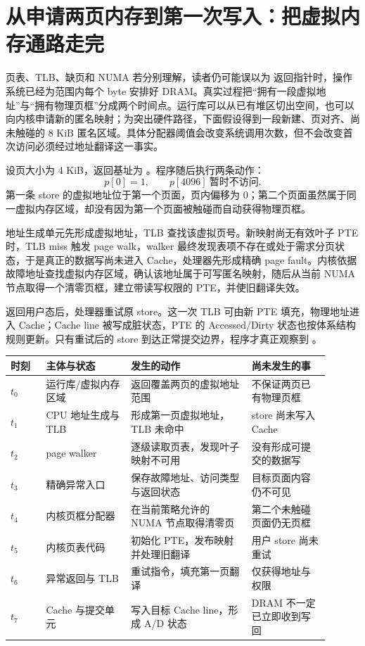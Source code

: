 \section{从申请两页内存到第一次写入：把虚拟内存通路走完}

页表、TLB、缺页和 NUMA 若分别理解，读者仍可能误以为  返回指针时，操作系统已经为范围内每个 byte 安排好 DRAM。真实过程把“拥有一段虚拟地址”与“拥有物理页框”分成两个时间点。运行库可以从已有堆区切出空间，也可以向内核申请新的匿名映射；为突出硬件路径，下面假设得到一段新建、页对齐、尚未触碰的 8 KiB 匿名区域。具体分配器阈值会改变系统调用次数，但不会改变首次访问必须经过地址翻译这一事实。

设页大小为 4 KiB，返回基址为 。程序随后执行两条动作：
\[
  p[0]=1,\qquad p[4096]\ \text{暂时不访问}.
\]
第一条 store 的虚拟地址位于第一个页面，页内偏移为 0；第二个页面虽然属于同一虚拟内存区域，却没有因为第一个页面被触碰而自动获得物理页框。


地址生成单元先形成虚拟地址，TLB 查找该虚拟页号。新映射尚无有效叶子 PTE 时，TLB miss 触发 page walk，walker 最终发现表项不存在或处于需求分页状态，于是真正的数据写尚未进入 Cache，处理器先形成精确 page fault。内核依据故障地址查找虚拟内存区域，确认该地址属于可写匿名映射，随后从当前 NUMA 节点取得一个清零页框，建立带读写权限的 PTE，并使旧翻译失效。

返回用户态后，处理器重试原 store。这一次 TLB 可由新 PTE 填充，物理地址进入 Cache；Cache line 被写成脏状态，PTE 的 Accessed/Dirty 状态也按体系结构规则更新。只有重试后的 store 到达正常提交边界，程序才真正观察到 。

\begin{longtable}{L{0.10\linewidth}L{0.24\linewidth}L{0.34\linewidth}L{0.22\linewidth}}
\toprule
时刻 & 主体与状态 & 发生的动作 & 尚未发生的事 \\
\midrule
$t_0$ & 运行库/虚拟内存区域 & 返回覆盖两页的虚拟地址范围 & 不保证两页已有物理页框 \\
$t_1$ & CPU 地址生成与 TLB & 形成第一页虚拟地址，TLB 未命中 & store 尚未写入 Cache \\
$t_2$ & page walker & 逐级读取页表，发现叶子映射不可用 & 没有形成可提交的数据写 \\
$t_3$ & 精确异常入口 & 保存故障地址、访问类型与返回状态 & 目标页面内容仍不可见 \\
$t_4$ & 内核页框分配器 & 在当前策略允许的 NUMA 节点取得清零页 & 第二个未触碰页面仍无页框 \\
$t_5$ & 内核页表代码 & 初始化 PTE，发布映射并处理旧翻译 & 用户 store 尚未重试 \\
$t_6$ & 异常返回与 TLB & 重试指令，填充第一页翻译 & 仅获得地址与权限 \\
$t_7$ & Cache 与提交单元 & 写入目标 Cache line，形成 A/D 状态 & DRAM 不一定已立即收到写回 \\
\bottomrule
\end{longtable}

